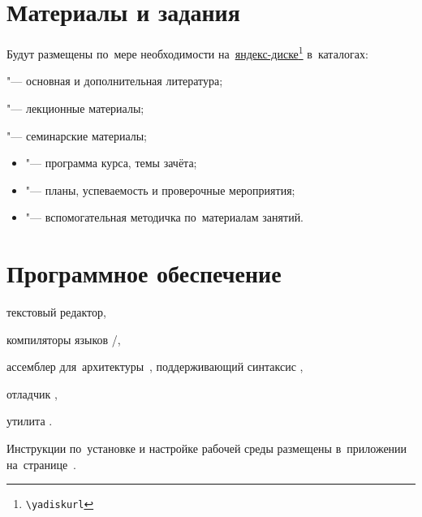 \section{Материалы и задания}
Будут размещены по~мере необходимости на~\href{\yadiskurl}{яндекс-диске\footnote{\nolinkurl{\yadiskurl}}} в~каталогах:
\begin{itemfeature}
  \item {} "--- основная и дополнительная литература;
  \item {} "--- лекционные материалы;
  \item {} "--- семинарские материалы;
  \begin{itemize}
    \item {} "--- программа курса, темы зачёта;
    \item {} "--- планы, успеваемость и проверочные мероприятия;
    \item {} "--- вспомогательная методичка по~материалам занятий.
  \end{itemize}
\end{itemfeature}



\section{Программное обеспечение}
\begin{itemfeature}
  \item текстовый редактор,
  \item компиляторы языков /,
  \item ассемблер для~архитектуры \,, поддерживающий синтаксис ,
  \item отладчик ,
  \item утилита .
\end{itemfeature}

Инструкции по~установке и настройке рабочей среды размещены в~приложении на~странице~\pageref{sect:workEnv}.
